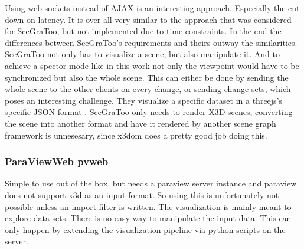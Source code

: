 Using web sockets instead of AJAX is an interesting approach.
\cite{Marion:2012:RCS:2338714.2338721} Especially the cut down on latency. It is
over all very similar to the approach that was considered for SceGraToo, but not
implemented due to time constraints. In the end the differences between
SceGraToo's requirements and theirs outway the similarities. SceGraToo not only
has to visualize a scene, but also manipulate it. And to achieve a spector mode
like in this work not only the viewpoint would have to be synchronized but also
the whole scene. This can either be done by sending the whole scene to the other
clients on every change, or sending change sets, which poses an interesting
challenge. They visualize a specific dataset in a threejs's specific JSON format
\cite{threejs-format}. SceGraToo only needs to render X3D scenes, converting the
scene into another format and have it rendered by another scene graph framework
is unnesesary, since x3dom does a pretty good job doing this.

\subsubsection{ParaViewWeb pvweb}
\label{paraviewweb-pvweb}

Simple to use out of the box, but needs a paraview server instance and
paraview does not support x3d as an input format. So using this is unfortunately
not possible unless an import filter is written. The visualization is
mainly meant to explore data sets. There is no easy way to manipulate
the input data. This can only happen by extending the visualization
pipeline via python scripts on the server.
